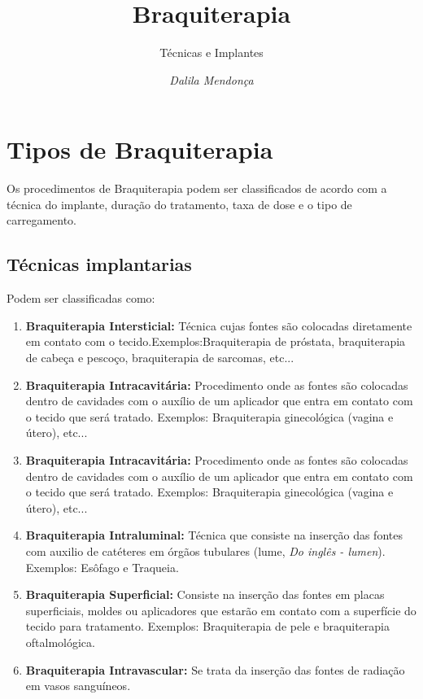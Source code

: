 \documentclass[11pt,a4paper]{article}
\title{Braquiterapia}
\author{Técnicas e Implantes\nocite{*}}
\date{\textit{Dalila Mendonça}}
\begin{document}
	\maketitle



	\section{Tipos de Braquiterapia}

	Os procedimentos de Braquiterapia podem ser classificados de acordo com a técnica do implante, duração do tratamento, taxa de dose e o tipo de carregamento.

		\subsection{Técnicas implantarias}

		Podem ser classificadas como:

		\begin{enumerate}
			\item \textbf{Braquiterapia Intersticial:} Técnica cujas fontes são colocadas diretamente em contato com o tecido.Exemplos:Braquiterapia de próstata, braquiterapia de cabeça e pescoço, braquiterapia de sarcomas, etc...
			
			\item \textbf{Braquiterapia Intracavitária:}  Procedimento onde as fontes são colocadas dentro de cavidades com o auxílio de um aplicador que entra em contato com o tecido que será tratado. Exemplos: Braquiterapia ginecológica (vagina e útero), etc...
			
			\item \textbf{Braquiterapia Intracavitária:}  Procedimento onde as fontes são colocadas dentro de cavidades com o auxílio de um aplicador que entra em contato com o tecido que será tratado. Exemplos: Braquiterapia ginecológica (vagina e útero), etc...
			
			\item \textbf{Braquiterapia Intraluminal:} Técnica que consiste na inserção das fontes com auxilio de catéteres em órgãos tubulares (lume, \textit{Do inglês - lumen}). Exemplos: Esôfago e Traqueia.
			
			\item \textbf{Braquiterapia Superficial:} Consiste na inserção das fontes em placas superficiais, moldes ou aplicadores que estarão em contato com a superfície do tecido para tratamento. Exemplos: Braquiterapia de pele e braquiterapia oftalmológica.
			
			\item \textbf{Braquiterapia Intravascular:} Se trata da inserção das fontes de radiação em vasos sanguíneos.

		\end{enumerate}
\end{document}
